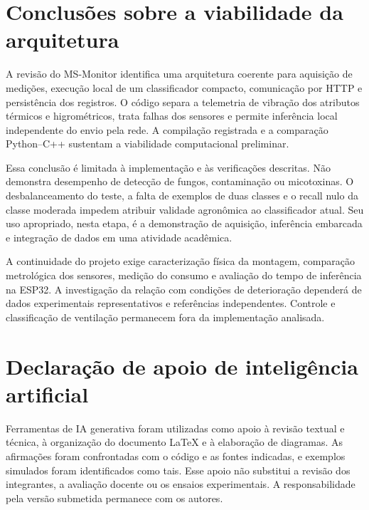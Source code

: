 \section{Conclusões sobre a viabilidade da arquitetura}

A revisão do MS-Monitor identifica uma arquitetura coerente para
aquisição de medições, execução local de um classificador compacto,
comunicação por HTTP e persistência dos registros. O código separa
a telemetria de vibração dos atributos térmicos e higrométricos,
trata falhas dos sensores e permite inferência local independente
do envio pela rede. A compilação registrada e a comparação
Python--C++ sustentam a viabilidade computacional preliminar.

Essa conclusão é limitada à implementação e às verificações descritas.
Não demonstra desempenho de detecção de fungos, contaminação ou
micotoxinas. O desbalanceamento do teste, a falta de exemplos de
duas classes e o recall nulo da classe moderada impedem atribuir
validade agronômica ao classificador atual. Seu uso apropriado,
nesta etapa, é a demonstração de aquisição, inferência embarcada
e integração de dados em uma atividade acadêmica.

A continuidade do projeto exige caracterização física da montagem,
comparação metrológica dos sensores, medição do consumo e avaliação
do tempo de inferência na ESP32. A investigação da relação com
condições de deterioração dependerá de dados experimentais
representativos e referências independentes. Controle e classificação
de ventilação permanecem fora da implementação analisada.

\section*{Declaração de apoio de inteligência artificial}

Ferramentas de IA generativa foram utilizadas como apoio à revisão
textual e técnica, à organização do documento LaTeX e à elaboração
de diagramas. As afirmações foram confrontadas com o código e as
fontes indicadas, e exemplos simulados foram identificados como tais.
Esse apoio não substitui a revisão dos integrantes, a avaliação
docente ou os ensaios experimentais. A responsabilidade pela versão
submetida permanece com os autores.
